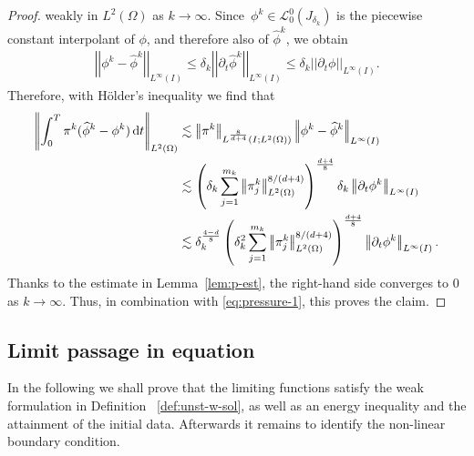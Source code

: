 \documentclass[reqno,a4paper]{amsart}
\def\norm#1{\left|\!\left| #1 \right|\!\right|}
\def\d{{\rm d}}
\def\dt{\,\d t}
\begin{document}
\begin{proof}
		weakly in $L^2(\Omega)$ as $k \to \infty$. 
		Since~$\phi^k \in \mathcal{L}^0_0(J_{\delta_k})$ is the piecewise constant interpolant of $\phi$, and therefore also of $\widehat \phi^k$, we obtain 
			\begin{align}\label{eq:pressure-2}
				\norm{\phi^k - \widehat{\phi}^k}_{L^\infty(I)} \leq  \delta_k \norm{\partial_t \widehat{\phi}^k}_{L^\infty(I)} 
				\leq \delta_k \norm{\partial_t {\phi}}_{L^\infty(I)}. %
			\end{align}
			Therefore, with Hölder's inequality we find that 
			\begin{equation}\label{eq:pressure-3}
				\begin{aligned}
					\norm{	\int_0^T \pi^k (\widehat \phi^k - \phi^k) \dt  }_{L^2(\Omega)}
					&\lesssim  \norm{\pi^k}_{L^{\frac{8}{d+4}}(I;L^2(\Omega))}	\norm{\phi^k - \widehat{\phi}^k}_{L^\infty(I)}  
					\\
					&\lesssim \left( \delta_k\sum_{ j = 1}^{m_k}  \norm{\pi^k_j}_{L^2(\Omega)}^{8/(d+4)} \right)^{\frac{d+4}{8}}  \delta_k \norm{\partial_t {\phi}^k}_{L^\infty(I)} 
					\\
					&\lesssim \delta_k^{\frac{4-d}{8}} 
					\left( \delta_k^2 \sum_{ j = 1}^{m_k}  \norm{\pi^k_j}_{L^2(\Omega)}^{8/(d+4)} \right)^{\frac{d+4}{8}}   \norm{\partial_t {\phi}^k}_{L^\infty(I)}. 
				\end{aligned}
			\end{equation}
			Thanks to the estimate in Lemma~\ref{lem:p-est},
			the right-hand side converges to $0$ as $k \to \infty$. 
			Thus, in combination with \eqref{eq:pressure-1}, this proves the claim.  
	\end{proof}
	
	\subsection{Limit passage in equation}\label{sec:unst-limit}
	
	In the following we shall prove that the limiting functions satisfy the weak formulation in Definition~ \ref{def:unst-w-sol}, as well as an energy inequality and the attainment of the initial data. 
	Afterwards it remains to identify the non-linear boundary condition.  
\end{document}
